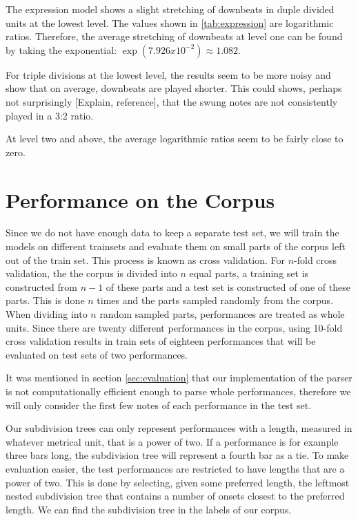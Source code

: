 The expression model shows a slight stretching of downbeats in duple divided units at the lowest level. The values shown in \ref{tab:expression} are logarithmic ratios. Therefore, the average stretching of downbeats at level one can be found by taking the exponential: $\exp(7.926 x 10^{-2}) \approx 1.082$. 

For triple divisions at the lowest level, the results seem to be more noisy and show that on average, downbeats are played shorter. This could shows, perhaps not surprisingly [Explain, reference], that the swung notes are not consistently played in a 3:2 ratio.

At level two and above, the average logarithmic ratios seem to be fairly close to zero.

\section{Performance on the Corpus}

Since we do not have enough data to keep a separate test set, we will train the models on different trainsets and evaluate them on small parts of the corpus left out of the train set. This process is known as cross validation. For $n$-fold cross validation, the the corpus is divided into $n$ equal parts, a training set is constructed from $n-1$ of these parts and a test set is constructed of one of these parts. This is done $n$ times and the parts sampled randomly from the corpus. When dividing into $n$ random sampled parts, performances are treated as whole units. Since there are twenty different performances in the corpus, using 10-fold cross validation results in train sets of eighteen performances that will be evaluated on test sets of two performances.

It was mentioned in section \ref{sec:evaluation} that our implementation of the parser is not computationally efficient enough to parse whole performances, therefore we will only consider the first few notes of each performance in the test set. 

Our subdivision trees can only represent performances with a length, measured in whatever metrical unit, that is a power of two. If a performance is for example three bars long, the subdivision tree will represent a fourth bar as a tie. To make evaluation easier, the test performances are restricted to have lengths that are a power of two. This is done by selecting, given some preferred length, the leftmost nested subdivision tree that contains a number of onsets closest to the preferred length. We can find the subdivision tree in the labels of our corpus.

